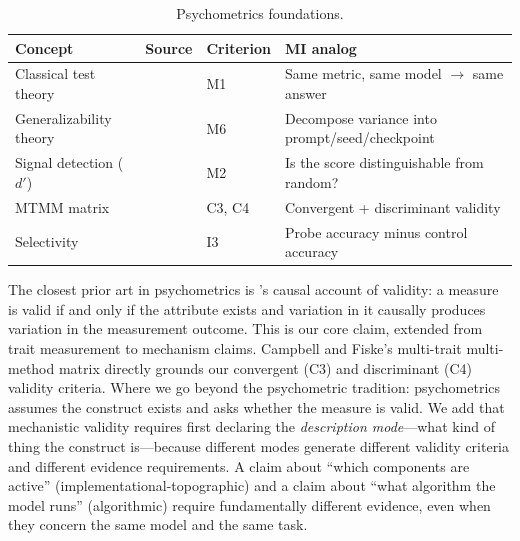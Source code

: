 \documentclass{article}
\begin{document}
\begin{table}[H]
\centering\small
\caption{Psychometrics foundations.}
\renewcommand{\arraystretch}{1.12}
\begin{tabular}{@{}l>{\raggedright\arraybackslash}p{2.2cm}l>{\raggedright\arraybackslash}p{4.5cm}@{}}
\toprule
\textbf{Concept} & \textbf{Source} & \textbf{Criterion} & \textbf{MI analog} \\
\midrule
Classical test theory & \citet{lord1968statistical} & M1 & Same metric, same model $\to$ same answer \\
\midrule
Generalizability theory & \citet{cronbach1972dependability} & M6 & Decompose variance into prompt/seed/checkpoint \\
\midrule
Signal detection ($d'$) & \citet{green1966signal} & M2 & Is the score distinguishable from random? \\
\midrule
MTMM matrix & \citet{campbell1959convergent} & C3, C4 & Convergent + discriminant validity \\
\midrule
Selectivity & \citet{hewitt2019designing} & I3 & Probe accuracy minus control accuracy \\
\bottomrule
\end{tabular}
\end{table}

The closest prior art in psychometrics is \citet{borsboom2004concept}'s causal account of validity: a measure is valid if and only if the attribute exists and variation in it causally produces variation in the measurement outcome. This is our core claim, extended from trait measurement to mechanism claims. Campbell and Fiske's \citep{campbell1959convergent} multi-trait multi-method matrix directly grounds our convergent (C3) and discriminant (C4) validity criteria. Where we go beyond the psychometric tradition: psychometrics assumes the construct exists and asks whether the measure is valid. We add that mechanistic validity requires first declaring the \emph{description mode}---what kind of thing the construct is---because different modes generate different validity criteria and different evidence requirements. A claim about ``which components are active'' (implementational-topographic) and a claim about ``what algorithm the model runs'' (algorithmic) require fundamentally different evidence, even when they concern the same model and the same task.
\end{document}
